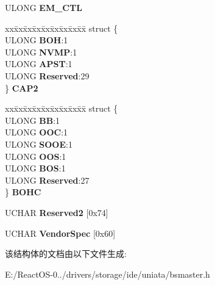 \begin{DoxyCompactItemize}
U\+L\+O\+NG {\bfseries E\+M\+\_\+\+C\+TL}
\item 
\mbox{\label{struct___i_d_e___a_h_c_i___r_e_g_i_s_t_e_r_s_a13cae0bc6e341a36c875c05e301e75e7}} 
\begin{tabbing}
xx\=xx\=xx\=xx\=xx\=xx\=xx\=xx\=xx\=\kill
struct \{\\
\>ULONG {\bfseries BOH}:1\\
\>ULONG {\bfseries NVMP}:1\\
\>ULONG {\bfseries APST}:1\\
\>ULONG {\bfseries Reserved}:29\\
\} {\bfseries CAP2}\\

\end{tabbing}\item 
\mbox{\label{struct___i_d_e___a_h_c_i___r_e_g_i_s_t_e_r_s_a8cb21c2726afb5a7d73cd52c656830d1}} 
\begin{tabbing}
xx\=xx\=xx\=xx\=xx\=xx\=xx\=xx\=xx\=\kill
struct \{\\
\>ULONG {\bfseries BB}:1\\
\>ULONG {\bfseries OOC}:1\\
\>ULONG {\bfseries SOOE}:1\\
\>ULONG {\bfseries OOS}:1\\
\>ULONG {\bfseries BOS}:1\\
\>ULONG {\bfseries Reserved}:27\\
\} {\bfseries BOHC}\\

\end{tabbing}\item 
\mbox{\label{struct___i_d_e___a_h_c_i___r_e_g_i_s_t_e_r_s_a5427a25661c8bbda45807aa073303339}} 
U\+C\+H\+AR {\bfseries Reserved2} \mbox{[}0x74\mbox{]}
\item 
\mbox{\label{struct___i_d_e___a_h_c_i___r_e_g_i_s_t_e_r_s_a7ebff19007d536f6adaafeedccbee5e8}} 
U\+C\+H\+AR {\bfseries Vendor\+Spec} \mbox{[}0x60\mbox{]}
\end{DoxyCompactItemize}


该结构体的文档由以下文件生成\+:\begin{DoxyCompactItemize}
\item 
E\+:/\+React\+O\+S-\/0../drivers/storage/ide/uniata/bsmaster.\+h\end{DoxyCompactItemize}
